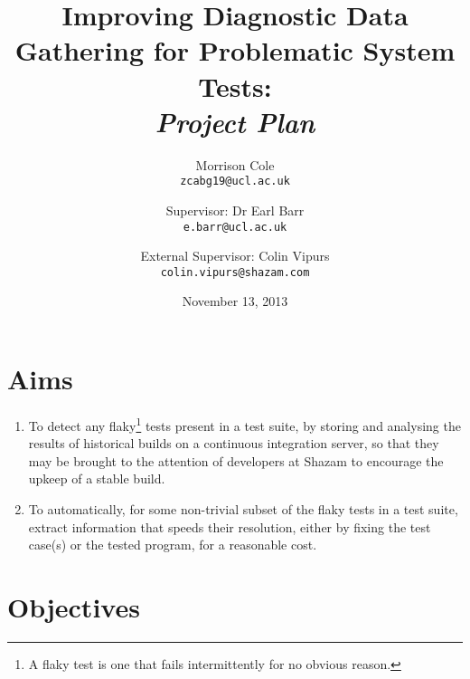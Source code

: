 
\setcounter{oldSectionCounter2}{\value{section}}
\setcounter{oldPageCounter2}{\value{page}}

\setcounter{section}{0}

\title{
	Improving Diagnostic Data Gathering for Problematic System Tests:\\
	\itshape{Project Plan}
}
\author{
	Morrison Cole\\
	\texttt{zcabg19@ucl.ac.uk}
	\and
	Supervisor: Dr Earl Barr\\
	\texttt{e.barr@ucl.ac.uk}
	\and
	External Supervisor: Colin Vipurs\\
	\texttt{colin.vipurs@shazam.com}
}
\date{November 13, 2013}

\maketitle

\section{Aims}

\begin{enumerate}
	\item{
		To detect any flaky\footnote{A flaky test is one that fails intermittently for no obvious reason.} tests present in a test suite, by storing and analysing the results of historical builds on a continuous integration server, so that they may be brought to the attention of developers at Shazam to encourage the upkeep of a stable build.
	}
	\item{
		To automatically, for some non-trivial subset of the flaky tests in a test suite, extract information that speeds their resolution, either by fixing the test case(s) or the tested program, for a reasonable cost.
	}
\end{enumerate}

\section{Objectives}


